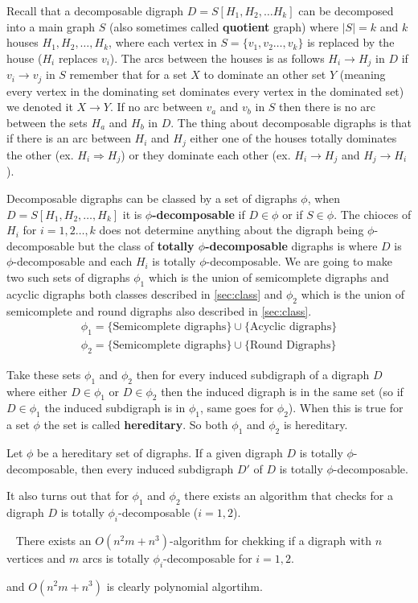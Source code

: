 Recall that a decomposable digraph $D=S[H_1,H_2,\dots H_k]$ can be decomposed into a main graph $S$ (also sometimes called \textbf{quotient} graph) where $|S|=k$ and $k$ houses $H_1,H_2,\dots , H_k$, where each vertex in $S=\lbrace v_1,v_2\dots ,v_k\rbrace$ is replaced by the house ($H_i$ replaces $v_i$).
The arcs between the houses is as follows $H_i \rightarrow H_j$ in $D$ if $v_i\rightarrow v_j$ in $S$ remember that for a set $X$ to dominate an other set $Y$ (meaning every vertex in the dominating set dominates every vertex in the dominated set) we denoted it $X \rightarrow Y$. 
If no arc between $v_a$ and $v_b$ in $S$ then there is no arc between the sets $H_a$ and $H_b$ in $D$. 
The thing about decomposable digraphs is that if there is an arc between $H_i$ and $H_j$ either one of the houses totally dominates the other (ex. $H_i \Rightarrow H_j$) or they dominate each other (ex. $H_i \rightarrow H_j$ and $H_j\rightarrow H_i$).

\noindent Decomposable digraphs can be classed by a set of digraphs $\phi$, when 
$D=S[H_1,H_2,\dots ,H_k]$ it is \textbf{$\phi$-decomposable} if $D\in \phi$ or if $S\in \phi$. The chioces of $H_i$ for $i=1,2\dots , k$ does not determine anything about the digraph being $\phi$-decomposable but the class of \textbf{totally $\phi$-decomposable} digraphs is where $D$ is $\phi$-decomposable and each $H_i$ is totally $\phi$-decomposable. 
We are going to make two such sets of digraphs $\phi_1$ which is the union of semicomplete digraphs and acyclic digraphs both classes described in \autoref{sec:class} and $\phi_2$ which is the union of semicomplete and round digraphs also described in \autoref{sec:class}.  
\begin{align}
    \phi_1=\lbrace \text{Semicomplete digraphs}\rbrace\cup \lbrace \text{Acyclic digraphs}\rbrace
    \label{eq:phi1}\\
    \phi_2=\lbrace \text{Semicomplete digraphs}\rbrace\cup \lbrace \text{Round Digraphs}\rbrace
    \label{eq:phi2}
\end{align}

Take these sets $\phi_1$ and $\phi_2$ then for every induced subdigraph of a digraph $D$ where either $D\in \phi_1$ or $D\in \phi_2$ then the induced digraph is in the same set (so if $D\in \phi_1$ the induced subdigraph is in $\phi_1$, same goes for $\phi_2$).
When this is true for a set $\phi$ the set is called \textbf{hereditary}. So both $\phi_1$ and $\phi_2$ is hereditary.
\begin{lemma}
    Let $\phi$ be a hereditary set of digraphs. If a given digraph $D$ is totally $\phi$-decomposable, then every induced subdigraph $D'$ of $D$ is totally $\phi$-decomposable.
    \label{lemma:hereditary}
\end{lemma}
It also turns out that for $\phi_1$ and $\phi_2$ there exists an algorithm that checks for a digraph $D$ is totally $\phi_i$-decomposable ($i=1,2$).
\begin{thm}~\cite{banggutin}
    There exists an $O(n^2m+n^3)$-algorithm for chekking if a digraph with $n$ vertices and $m$ arcs is totally $\phi_i$-decomposable for $i=1,2$.
    \label{thm:phipoly}
\end{thm}
and $O(n^2m+n^3)$ is clearly polynomial algortihm. 